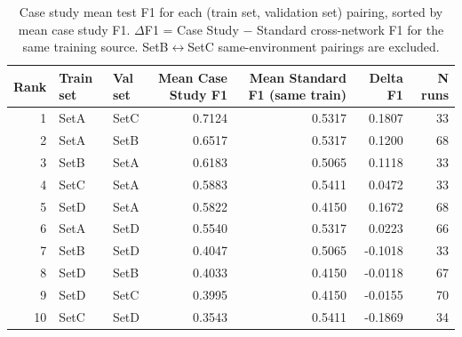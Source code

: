 \begin{table}
\caption{Case study mean test F1 for each (train set, validation set) pairing, sorted by mean case study F1. $\Delta$F1 = Case Study $-$ Standard cross-network F1 for the same training source. SetB$\leftrightarrow$SetC same-environment pairings are excluded.}
\label{tab:q6_pairings}
\begin{tabular}{rllrrrr}
\toprule
Rank & Train set & Val set & Mean Case Study F1 & Mean Standard F1 (same train) & Delta F1 & N runs \\
\midrule
1 & SetA & SetC & 0.7124 & 0.5317 & 0.1807 & 33 \\
2 & SetA & SetB & 0.6517 & 0.5317 & 0.1200 & 68 \\
3 & SetB & SetA & 0.6183 & 0.5065 & 0.1118 & 33 \\
4 & SetC & SetA & 0.5883 & 0.5411 & 0.0472 & 33 \\
5 & SetD & SetA & 0.5822 & 0.4150 & 0.1672 & 68 \\
6 & SetA & SetD & 0.5540 & 0.5317 & 0.0223 & 66 \\
7 & SetB & SetD & 0.4047 & 0.5065 & -0.1018 & 33 \\
8 & SetD & SetB & 0.4033 & 0.4150 & -0.0118 & 67 \\
9 & SetD & SetC & 0.3995 & 0.4150 & -0.0155 & 70 \\
10 & SetC & SetD & 0.3543 & 0.5411 & -0.1869 & 34 \\
\bottomrule
\end{tabular}
\end{table}
